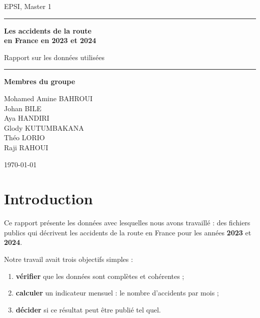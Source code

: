 \documentclass[11pt,a4paper]{article}
\begin{document}
\begin{titlepage}
  \centering
  \vspace*{2cm}
  {\color{gris}\large EPSI, Master 1\par}
  \vspace{1.5cm}
  {\color{bleu}\rule{\linewidth}{1pt}\par}
  \vspace{0.6cm}
  {\Huge\bfseries\color{bleu} Les accidents de la route\\[0.3cm] en France en 2023 et 2024\par}
  \vspace{0.5cm}
  {\Large Rapport sur les données utilisées\par}
  \vspace{0.6cm}
  {\color{bleu}\rule{\linewidth}{1pt}\par}
  \vspace{2cm}

  {\large\bfseries Membres du groupe\par}
  \vspace{0.4cm}
  {\large
    Mohamed Amine BAHROUI\\[2pt]
    Johan BILE\\[2pt]
    Aya HANDIRI\\[2pt]
    Glody KUTUMBAKANA\\[2pt]
    Théo LORIO\\[2pt]
    Raji RAHOUI\par}

  \vfill
  {\color{gris}\today\par}
\end{titlepage}

\tableofcontents
\newpage

\section{Introduction}

Ce rapport présente les données avec lesquelles nous avons travaillé : des
fichiers publics qui décrivent les accidents de la route en France pour les
années \textbf{2023} et \textbf{2024}.

Notre travail avait trois objectifs simples :
\begin{enumerate}
  \item \textbf{vérifier} que les données sont complètes et cohérentes ;
  \item \textbf{calculer} un indicateur mensuel : le nombre d'accidents par mois ;
  \item \textbf{décider} si ce résultat peut être publié tel quel.
\end{enumerate}
\end{document}
